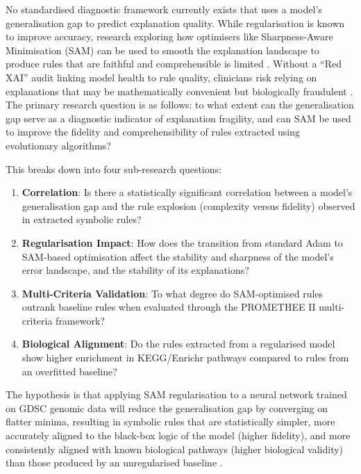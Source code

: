 \label{sec:problem}

No standardised diagnostic framework currently exists that uses a model's generalisation gap to
predict explanation quality. While regularisation is known to improve accuracy, research exploring
how optimisers like Sharpness-Aware Minimisation (SAM) can be used to smooth the explanation
landscape to produce rules that are faithful and comprehensible is limited
\cite{Dombrowski2022, Springer2024}. Without a ``Red XAI'' audit linking model health to rule
quality, clinicians risk relying on explanations that may be mathematically convenient but
biologically fraudulent \cite{Longo2024}.
\\
The primary research question is as follows: to what extent can the generalisation gap serve as a
diagnostic indicator of explanation fragility, and can SAM be used to improve the fidelity and
comprehensibility of rules extracted using evolutionary algorithms?

This breaks down into four sub-research questions:

\begin{enumerate}
    \item \textbf{Correlation}: Is there a statistically significant correlation between a model's generalisation gap and the rule explosion (complexity versus fidelity) observed in extracted symbolic rules?
    \item \textbf{Regularisation Impact}: How does the transition from standard Adam to SAM-based optimisation affect the stability and sharpness of the model's error landscape, and the stability of its explanations?
    \item \textbf{Multi-Criteria Validation}: To what degree do SAM-optimised rules outrank baseline rules when evaluated through the PROMETHEE II multi-criteria framework?
    \item \textbf{Biological Alignment}: Do the rules extracted from a regularised model show higher enrichment in KEGG/Enrichr pathways compared to rules from an overfitted baseline?
\end{enumerate}

\noindent
The hypothesis is that applying SAM regularisation to a neural network trained on GDSC genomic
data will reduce the generalisation gap by converging on flatter minima, resulting in symbolic rules
that are statistically simpler, more accurately aligned to the black-box logic of the model (higher
fidelity), and more consistently aligned with known biological pathways (higher biological validity)
than those produced by an unregularised baseline \cite{Foret2021, Li2018, Springer2024, Yedjour2024}.

